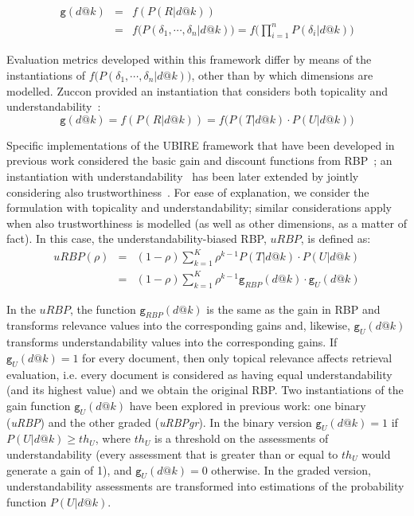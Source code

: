 \begin{eqnarray*}
    \mathtt{g}(d@k) &=& f(P(R|d@k)) \\
    &=& f\big(P(\delta_1, \cdots, \delta_n|d@k)\big) = f\Big(\prod_{i=1}^n P(\delta_i|d@k)\Big) 
\end{eqnarray*}


Evaluation metrics developed within this framework differ by means of the instantiations of $f\big(P(\delta_1, \cdots, \delta_n|d@k)\big)$, other than by which dimensions are modelled. Zuccon provided an instantiation that considers both topicality and understandability~\cite{zuccon16}:
%
\vspace{-4pt}
\begin{equation*}
\mathtt{g}(d@k) = f(P(R|d@k)) = f\big(P(T|d@k) \cdot P(U|d@k)\big)
\end{equation*}

Specific implementations of the UBIRE framework that have been developed in previous work considered the basic gain and discount functions from RBP~\cite{moffat08}; an instantiation with understandability~\cite{zuccon14,zuccon16} has been later extended by jointly considering also trustworthiness~\cite{clefIR17}. For ease of explanation, we consider the formulation with topicality and understandability; similar considerations apply when also trustworthiness is modelled (as well as other dimensions, as a matter of fact). In this case, the understandability-biased RBP, $uRBP$, is defined as: 
%
\begin{eqnarray*}
    uRBP(\rho) &=& (1-\rho) \sum_{k=1}^{K} \rho^{k-1} P(T|d@k) \cdot P(U|d@k)\\ 
&=& (1-\rho) \sum_{k=1}^{K} \rho^{k-1} \mathtt{g}_{RBP}(d@k) \cdot \mathtt{g}_{U}(d@k)
\label{eq:RBP}
\end{eqnarray*}

In the $uRBP$, the function $\mathtt{g}_{RBP}(d@k)$ is the same as the gain in RBP and transforms relevance values into the corresponding gains and, likewise, $\mathtt{g}_{U}(d@k)$ transforms understandability values into the corresponding gains. 
If $\mathtt{g}_{U}(d@k)=1$ for every document, then only topical relevance affects retrieval evaluation, i.e. every document is considered as having equal understandability (and its highest value) and we obtain the original RBP. Two instantiations of the gain function $\mathtt{g}_{U}(d@k)$ have been explored in previous work: one binary (\textit{uRBP}) and the other graded (\textit{uRBPgr}). In the binary version $\mathtt{g}_{U}(d@k) = 1$ if $P(U|d@k) \geq th_U$, where $th_U$ is a threshold on the assessments of understandability (every assessment that is greater than or equal to $th_U$ would generate a gain of 1), and $\mathtt{g}_{U}(d@k)=0$ otherwise. In the graded version, understandability assessments are transformed into estimations of the probability function $P(U|d@k)$.

